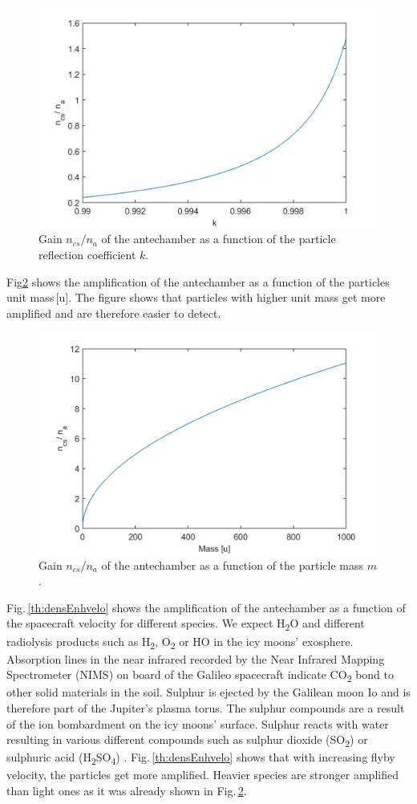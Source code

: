 		\begin{figure}[h!] %
			\centering
			\includegraphics[width= .7\textwidth]{Bilder/k.png}
			\caption{Gain $n_{cs}/n_a$ of the antechamber as a function of the particle reflection coefficient $k$.}
			\label{th:densEnhk}
		\end{figure}
		Fig\ref{th:densEnhm} shows the amplification of the antechamber as a function of the particles unit mass\,[u]. The figure shows that particles with higher unit mass get more amplified and are therefore easier to detect.\\
		\begin{figure}[h!] %
			\centering
			\includegraphics[width= .7\textwidth]{Bilder/m.png}
			\caption{Gain $n_{cs}/n_a$ of the antechamber as a function of the particle mass $m$.}
			\label{th:densEnhm}
		\end{figure}
		Fig.\,\ref{th:densEnhvelo} shows the amplification of the antechamber as a function of the spacecraft velocity for different species. We expect H\textsubscript{2}O and different radiolysis products such as H\textsubscript{2}, O\textsubscript{2} or HO in the icy moons' exosphere. Absorption lines in the near infrared recorded by the Near Infrared Mapping Spectrometer (NIMS) on board of the Galileo spacecraft indicate CO\textsubscript{2} bond to other solid materials in the soil. Sulphur is ejected by the Galilean moon Io and is therefore part of the Jupiter's plasma torus. The sulphur compounds are a result of the ion bombardment on the icy moons' surface. Sulphur reacts with water resulting in various different compounds such as sulphur dioxide (SO\textsubscript{2}) or sulphuric acid (H\textsubscript{2}SO\textsubscript{4}) \cite{Collins_2014}. Fig.\,\ref{th:densEnhvelo} shows that with increasing flyby velocity, the particles get more amplified. Heavier species are stronger amplified than light ones as it was already shown in Fig.\,\ref{th:densEnhm}.\\
